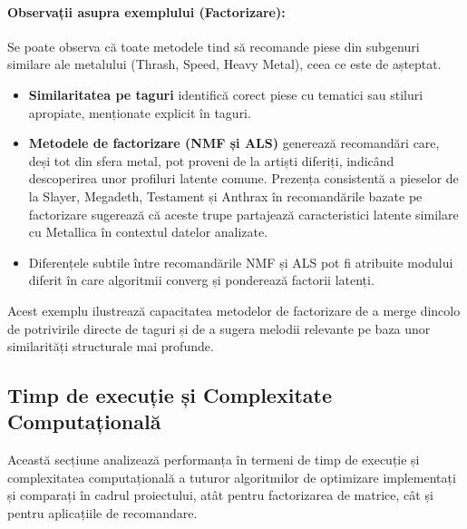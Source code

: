 \documentclass[12pt,a4paper]{article}
\begin{document}
	\paragraph{Observații asupra exemplului (Factorizare):}
	Se poate observa că toate metodele tind să recomande piese din subgenuri similare ale metalului (Thrash, Speed, Heavy Metal), ceea ce este de așteptat.
	\begin{itemize}
		\item \textbf{Similaritatea pe taguri} identifică corect piese cu tematici sau stiluri apropiate, menționate explicit în taguri.
		\item \textbf{Metodele de factorizare (NMF și ALS)} generează recomandări care, deși tot din sfera metal, pot proveni de la artiști diferiți, indicând descoperirea unor profiluri latente comune. Prezența consistentă a pieselor de la Slayer, Megadeth, Testament și Anthrax în recomandările bazate pe factorizare sugerează că aceste trupe partajează caracteristici latente similare cu Metallica în contextul datelor analizate.
		\item Diferențele subtile între recomandările NMF și ALS pot fi atribuite modului diferit în care algoritmii converg și ponderează factorii latenți.
	\end{itemize}
	Acest exemplu ilustrează capacitatea metodelor de factorizare de a merge dincolo de potrivirile directe de taguri și de a sugera melodii relevante pe baza unor similarități structurale mai profunde.

	\subsection{Timp de execuție și Complexitate Computațională}
	Această secțiune analizează performanța în termeni de timp de execuție și complexitatea computațională a tuturor algoritmilor de optimizare implementați și comparați în cadrul proiectului, atât pentru factorizarea de matrice, cât și pentru aplicațiile de recomandare.
\end{document}
